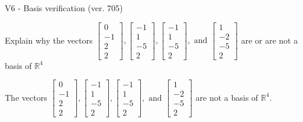 \begin{exercise}
  \begin{exerciseTitle}V6 - Basis verification (ver. 705)\end{exerciseTitle}
  \begin{exerciseStatement}
    Explain why the vectors \(\left[\begin{array}{r}
0 \\
-1 \\
2 \\
2
\end{array}\right] , \left[\begin{array}{r}
-1 \\
1 \\
-5 \\
2
\end{array}\right] , \left[\begin{array}{r}
-1 \\
1 \\
-5 \\
2
\end{array}\right] , \text{ and } \left[\begin{array}{r}
1 \\
-2 \\
-5 \\
2
\end{array}\right]\) are or are not a basis of \(\mathbb{R}^4\)	


  \end{exerciseStatement}
  \begin{exerciseAnswer}
   The vectors \(\left[\begin{array}{r}
0 \\
-1 \\
2 \\
2
\end{array}\right] , \left[\begin{array}{r}
-1 \\
1 \\
-5 \\
2
\end{array}\right] , \left[\begin{array}{r}
-1 \\
1 \\
-5 \\
2
\end{array}\right] , \text{ and } \left[\begin{array}{r}
1 \\
-2 \\
-5 \\
2
\end{array}\right]\) 
  	 are not  a basis of \(\mathbb{R}^4\).
  


  \end{exerciseAnswer}
\end{exercise}